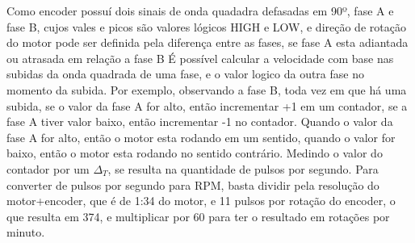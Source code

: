 Como encoder possuí dois sinais de onda quadadra defasadas em 90º, fase A e fase B, cujos vales e picos são valores lógicos HIGH e LOW, 
e direção de rotação do motor pode ser definida pela diferença entre as fases, se fase A esta adiantada ou atrasada em relação a fase B
É possível calcular a velocidade com base nas subidas da onda quadrada de uma fase, e o valor logico da outra fase no momento da subida.
Por exemplo,  observando a fase B, toda vez em que há uma subida, se o valor da fase A for alto, então incrementar +1 em um contador, se a fase A tiver valor baixo, então incrementar -1 no contador.
Quando o valor da fase A for alto, então o motor esta rodando em um sentido,  quando o valor  for baixo, então o motor esta rodando no sentido contrário.
Medindo o valor do contador por um $\Delta_{T}$, se resulta na quantidade de pulsos por segundo.
Para converter de pulsos por segundo para RPM, basta dividir pela resolução do motor+encoder,  que é de 1:34 do motor, e 11 pulsos por rotação do encoder, o que resulta em 374,
e multiplicar por 60 para ter o resultado em rotações por minuto.





